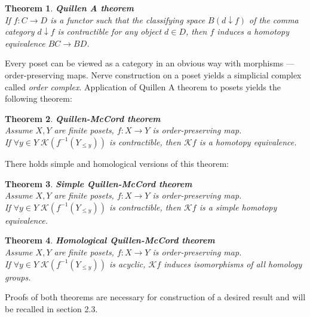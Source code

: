 \documentclass[a4paper, 12pt]{article}
\newtheorem{theorem}{Theorem}
\theoremstyle{definition}
\theoremstyle{remark}
\newcommand{\define}[1]{{\textit{#1}}}
\begin{document}
\begin{theorem} \textbf{Quillen A theorem}\\
  If $f: C \to D$ is a functor such that the classifying space $B(d \downarrow f)$ of the comma category $d \downarrow f$ is contractible for any object $d \in D$, then $f$ induces a homotopy equivalence $BC \to BD$.
\end{theorem}

Every poset can be viewed as a category in an obvious way with morphisms --- order-preserving maps. Nerve construction on a poset yields a simplicial complex called \define{order complex}. Application of Quillen A theorem to posets yields the following theorem:

\begin{theorem} \textbf{Quillen-McCord theorem}\\
  Assume $X, Y$ are finite posets, $f : X \to Y$ is order-preserving map.\\
  If $\forall y \in Y\;\mathcal{K}(f^{-1}(Y_{\leqslant y}))$ is contractible, then $\mathcal{K}f$ is a homotopy equivalence.\\
\end{theorem}

There holds simple {\cite[Theorem 1.2]{Bar11}} and homological {\cite[Corollary 5.5]{Bar11}} versions of this theorem:

\begin{theorem} \textbf{Simple Quillen-McCord theorem}\\
  Assume $X, Y$ are finite posets, $f : X \to Y$ is order-preserving map.\\
  If $\forall y \in Y\;\mathcal{K}(f^{-1}(Y_{\leqslant y}))$ is contractible, then $\mathcal{K}f$ is a simple homotopy equivalence.\\
\end{theorem}

\begin{theorem} \textbf{Homological Quillen-McCord theorem}\\
  Assume $X, Y$ are finite posets, $f : X \to Y$ is order-preserving map.\\
  If $\forall y \in Y\;\mathcal{K}(f^{-1}(Y_{\leqslant y}))$ is acyclic, $\mathcal{K}f$ induces isomorphisms of all homology groups.\\
\end{theorem}

Proofs of both theorems are necessary for construction of a desired result and will be recalled in section 2.3.
\end{document}
